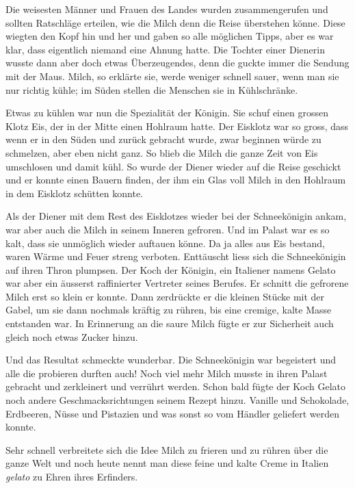 Die weisesten Männer und Frauen des Landes wurden zusammengerufen und sollten Ratschläge erteilen, wie die Milch denn die Reise überstehen könne. Diese wiegten den Kopf hin und her und gaben so alle möglichen Tipps, aber es war klar, dass eigentlich niemand eine Ahnung hatte. Die Tochter einer Dienerin wusste dann aber doch etwas Überzeugendes, denn die guckte immer die Sendung mit der Maus. Milch, so erklärte sie, werde weniger schnell sauer, wenn man sie nur richtig kühle; im Süden stellen die Menschen sie in Kühlschränke.

Etwas zu kühlen war nun die Spezialität der Königin. Sie schuf einen grossen Klotz Eis, der in der Mitte einen Hohlraum hatte. Der Eisklotz war so gross, dass wenn er in den Süden und zurück gebracht wurde, zwar beginnen würde zu schmelzen, aber eben nicht ganz. So blieb die Milch die ganze Zeit von Eis umschlosen und damit kühl. So wurde der Diener wieder auf die Reise geschickt und er konnte einen Bauern finden, der ihm ein Glas voll Milch in den Hohlraum in dem Eisklotz schütten konnte.

Als der Diener mit dem Rest des Eisklotzes wieder bei der Schneekönigin ankam, war aber auch die Milch in seinem Inneren gefroren. Und im Palast war es so kalt, dass sie unmöglich wieder auftauen könne. Da ja alles aus Eis bestand, waren Wärme und Feuer streng verboten. Enttäuscht liess sich die Schneekönigin auf ihren Thron plumpsen. Der Koch der Königin, ein Italiener namens Gelato war aber ein äusserst raffinierter Vertreter seines Berufes. Er schnitt die gefrorene Milch erst so klein er konnte. Dann zerdrückte er die kleinen Stücke mit der Gabel, um sie dann nochmals kräftig zu rühren, bis eine cremige, kalte Masse entstanden war. In Erinnerung an die saure Milch fügte er zur Sicherheit auch gleich noch etwas Zucker hinzu.

Und das Resultat schmeckte wunderbar. Die Schneekönigin war begeistert und alle die probieren durften auch! Noch viel mehr Milch musste in ihren Palast gebracht und zerkleinert und verrührt werden. Schon bald fügte der Koch Gelato noch andere Geschmacksrichtungen seinem Rezept hinzu. Vanille und Schokolade, Erdbeeren, Nüsse und Pistazien und was sonst so vom Händler geliefert werden konnte.

Sehr schnell verbreitete sich die Idee Milch zu frieren und zu rühren über die ganze Welt und noch heute nennt man diese feine und kalte Creme in Italien {\itshape gelato} zu Ehren ihres Erfinders.  \hfill {\color{red}\decofourleft}
